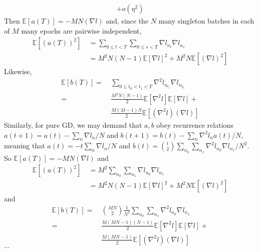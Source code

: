\documentclass[openany, notitlepage, justified]{tufte-book}
\theoremstyle{plain}
\theoremstyle{definition}
\newcommand{\expct}[1]{\mathbb{E}\left[#1\right]}
\begin{document}
\begin{shaded}
\begin{align*}
                                            +   o(\eta^2)
                \end{align*}
                Then $\expct{a(T)} = -MN(\nabla l)$ and, since the $N$ many
                singleton batches in each of $M$ many epochs are pairwise
                independent,
                \begin{align*}
                    \expct{(a(T))^2}
                    ~&=
                    \sum_{0\leq t<T} \sum_{0\leq s<T} \nabla l_{n_t} \nabla l_{n_s} \\
                    ~&= 
                    M^2N(N-1)   \expct{\nabla l}^2 +
                    M^2N        \expct{(\nabla l)^2}
                \end{align*}
                Likewise, 
                \begin{align*}
                    \expct{b(T)}
                    = 
                    ~&\sum_{0\leq t_0 < t_1 < T} \nabla^2 l_{n_{t_1}} \nabla l_{n_{t_0}} \\
                    =
                    ~&\frac{M^2N(N-1)}{2} \expct{\nabla^2 l} \expct{\nabla l} + \\
                    ~&\frac{M(M-1)N}{2}  \expct{(\nabla^2 l) (\nabla l)} 
                \end{align*}
                Similarly, for pure GD, we may demand that $a, b$ obey recurrence
                relations $a(t+1) = a(t) - \sum_n \nabla l_n/N$ and
                $b(t+1) = b(t) - \sum_n \nabla^2 l_n a(t)/N$, meaning that
                $a(t) = -t \sum_n \nabla l_n/N$ and
                $b(t) = {t \choose 2} \sum_{n_0} \sum_{n_1} \nabla^2 l_{n_0} \nabla l_{n_1}/N^2$.
                So $\expct{a(T)} = -MN(\nabla l)$ and
                \begin{align*}
                    \expct{(a(T))^2}
                    ~&=
                    M^2 
                    \sum_{n_0} \sum_{n_1} \nabla l_{n_0} \nabla l_{n_1} \\
                    ~&= 
                    M^2 N(N-1)  \expct{\nabla l}^2 + 
                    M^2 N       \expct{(\nabla l)^2}
                \end{align*}
                and
                \begin{align*}
                    \expct{b(T)}
                    = 
                    ~&{MN \choose 2}\frac{1}{N^2}
                    \sum_{n_0} \sum_{n_1} \nabla^2 l_{n_0} \nabla l_{n_1} \\
                    =
                    ~&\frac{M(MN-1)(N-1)}{2} \expct{\nabla^2 l} \expct{\nabla l} + \\
                    ~&\frac{M(MN-1)}{2}      \expct{(\nabla^2 l) (\nabla l)} 
                \end{align*}
                $\cdots$
            \end{shaded}
\end{document}

